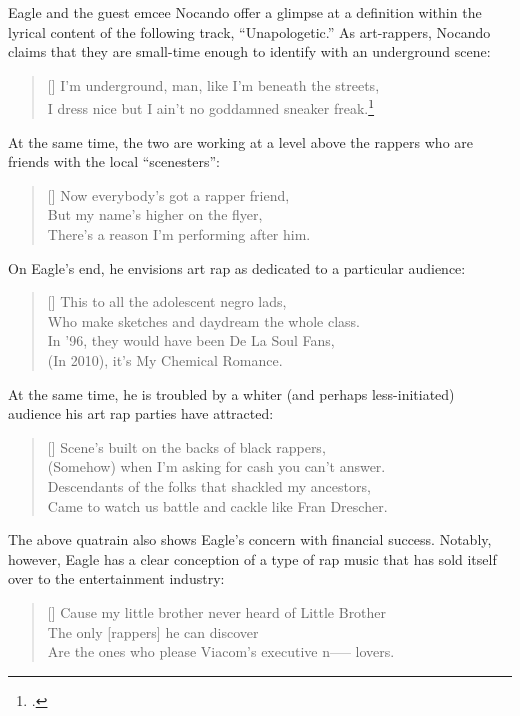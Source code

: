 Eagle and the guest emcee Nocando offer a glimpse at a definition within the lyrical content of the following
track, ``Unapologetic.'' As art-rappers, Nocando claims that they are small-time enough to identify with 
an underground scene:
\settowidth{\versewidth}{I dress nice but I ain't no goddamned sneaker freak.}
    \begin{verse}[\versewidth]
        I'm underground, man, like I'm beneath the streets, \\ 
        I dress nice but I ain't no goddamned sneaker freak.\footnote{
            \cite{openmikeeagle2010}.}
    \end{verse}
At the same time, the two are working at a level above the rappers who are friends with the local 
``scenesters'':
\settowidth{\versewidth}{There's a reason I'm performing after him.}
    \begin{verse}[\versewidth]
        Now everybody's got a rapper friend, \\ 
        But my name's higher on the flyer,\\
        There's a reason I'm performing after him.
    \end{verse}
On Eagle's end, he envisions art rap as dedicated to a particular audience:
\settowidth{\versewidth}{Who make sketches and daydream the whole class.}
    \begin{verse}[\versewidth]
        This to all the adolescent negro lads, \\
        Who make sketches and daydream the whole class. \\
        In '96, they would have been De La Soul Fans, \\
        (In 2010), it's My Chemical Romance.
    \end{verse}
At the same time, he is troubled by a whiter (and perhaps less-initiated) audience his art rap 
parties have attracted:
\settowidth{\versewidth}{Came to watch us battle and cackle like Fran Drescher.}
    \begin{verse}[\versewidth]
        Scene's built on the backs of black rappers, \\
        (Somehow) when I'm asking for cash you can't answer. \\ 
        Descendants of the folks that shackled my ancestors, \\ 
        Came to watch us battle and cackle like Fran Drescher.
    \end{verse}
The above quatrain also shows Eagle's concern with financial success. Notably, however, Eagle has a clear 
conception of a type of rap music that has sold itself over to the entertainment industry:
\settowidth{\versewidth}{Cause my little brother never heard of Little Brother \textellipsis}
    \begin{verse}[\versewidth]
        Cause my little brother never heard of Little Brother \textellipsis \\ 
        The only [rappers] he can discover \\
        Are the ones who please Viacom's executive n----- lovers.
    \end{verse}

